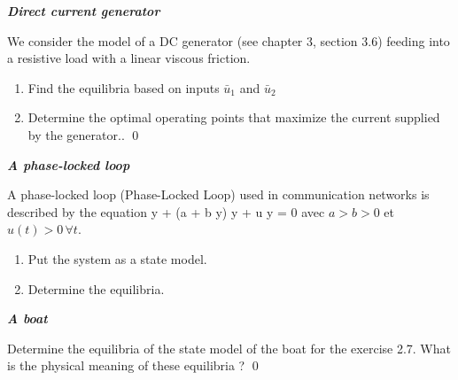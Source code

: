 \begin{exercice}{\bf \em Direct current generator}

We consider the model of a DC generator (see chapter 3, section 3.6) feeding into a resistive load with a linear viscous friction.
\begin{enumerate}
\item Find the equilibria based on inputs $\bar u_1$ and $\bar u_2$
\item Determine the optimal operating points that maximize the current supplied by the generator.. \qed
\end{enumerate}
\end{exercice}
\vv

\begin{exercice}{\bf \em A phase-locked loop}

A phase-locked loop (Phase-Locked Loop) used in communication networks is described by the equation
\eqnn
\ddot y + (a + b \cos y) \dot y + u \sin y = 0
\eeqnn
avec $a > b > 0$ et $u(t) > 0 \, \forall t$. 
\begin{enumerate}
\item Put the system as a state model.
\item Determine the equilibria.
\end{enumerate}
\end{exercice}
\vv

\begin{exercice}{\bf \em A boat}

Determine the equilibria of the state model of the boat for the exercise 2.7. What is the physical meaning of these equilibria ? \qed
\end{exercice}
\vv 

